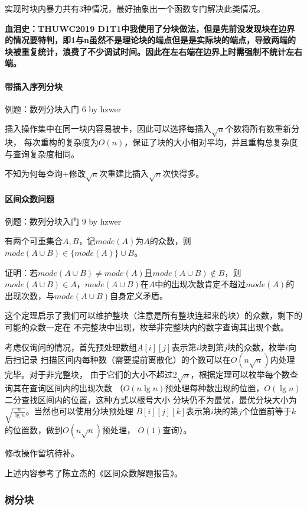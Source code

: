 实现时块内暴力共有3种情况，最好抽象出一个函数专门解决此类情况。

{\bfseries 血泪史：THUWC2019 D1T1中我使用了分块做法，但是先前没发现块在边界的情况要特判，即1与n虽然不是理论块的端点但是是实际块的端点，导致两端的块被重复统计，浪费了不少调试时间。因此在左右端在边界上时需强制不统计左右端。}
\paragraph{带插入序列分块}

例题：数列分块入门 6 by hzwer

插入操作集中在同一块内容易被卡，因此可以选择每插入$\sqrt{n}$个数将所有数重新分块，
每次重构的复杂度为$O(n)$，保证了块的大小相对平均，并且重构总复杂度与查询复杂度相同。

不知为何每查询+修改$\sqrt{n}$次重建比插入$\sqrt{n}$次快得多。
\paragraph{区间众数问题}

例题：数列分块入门 9 by hzwer

\begin{theorem}
	有两个可重集合$A,B$，记$mode(A)$为$A$的众数，则\\
	$mode(A\cup B)\in \{mode(A)\}\cup B$。
\end{theorem}

证明：若$mode(A\cup B)\neq mode(A)$且$mode(A\cup B)\not \in B$，则
$mode(A\cup B)\in A$，$mode(A\cup B)$在$A$中的出现次数肯定不超过$mode(A)$的
出现次数，与$mode(A\cup B)$自身定义矛盾。

这个定理启示了我们可以维护整块（注意是所有整块连起来的块）的众数，剩下的可能的众数一定在
不完整块中出现，枚举非完整块内的数字查询其出现个数。

考虑仅询问的情况，首先预处理数组$A[i][j]$表示第$i$块到第$j$块的众数，枚举$i$向后扫记录
扫描区间内每种数（需要提前离散化）的个数可以在$O(n\sqrt{n})$内处理完毕。对于非完整块，
由于它们的大小不超过$2\sqrt{n}$，根据定理可以枚举每个数查询其在查询区间内的出现次数
（$O(n\lg n)$预处理每种数出现的位置，$O(\lg n)$二分查找区间内的位置，这种方式以根号大小
分块仍不为最优，最优分块大小为$\sqrt{\frac{n}{\lg n}}$。当然也可以使用分块预处理
$B[i][j][k]$表示第$i$块的第$j$个位置前等于$k$的位置数，做到$O(n\sqrt{n})$预处理，
$O(1)$查询）。

修改操作留坑待补。

上述内容参考了陈立杰的《区间众数解题报告》。
\subsubsection{树分块}
